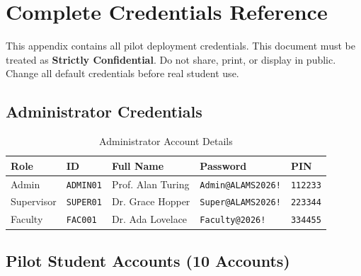 \chapter{Complete Credentials Reference}
\label{app:credentials}

\begin{tcolorbox}[dangerbox, title={\faExclamationCircle\quad Security Notice}]
This appendix contains all pilot deployment credentials. This document must be treated as \textbf{Strictly Confidential}. Do not share, print, or display in public. Change all default credentials before real student use.
\end{tcolorbox}

\section{Administrator Credentials}

\begin{table}[h!]
\centering
\caption{Administrator Account Details}
\begin{tabularx}{\textwidth}{llXll}
\toprule
\textbf{Role} & \textbf{ID} & \textbf{Full Name} & \textbf{Password} & \textbf{PIN}\\
\midrule
\rowcolor{red!10}
Admin & \texttt{ADMIN01} & Prof. Alan Turing & \texttt{Admin@ALAMS2026!} & \texttt{112233}\\
\rowcolor{aurxonamber!10}
Supervisor & \texttt{SUPER01} & Dr. Grace Hopper & \texttt{Super@ALAMS2026!} & \texttt{223344}\\
\rowcolor{aurxonblue!10}
Faculty & \texttt{FAC001} & Dr. Ada Lovelace & \texttt{Faculty@2026!} & \texttt{334455}\\
\bottomrule
\end{tabularx}
\end{table}

\section{Pilot Student Accounts (10 Accounts)}


